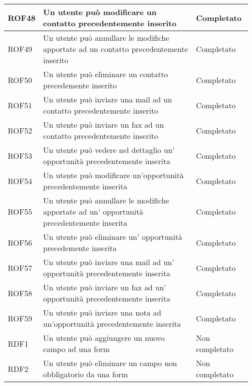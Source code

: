 \begin{longtable}[h]{|p{2.5cm}|p{8cm}|p{2.5cm}|}
	\hline
	\rule[-3mm]{0mm}{0.8cm}
	ROF48&Un utente può modificare un contatto precedentemente inserito&Completato\\
	\hline
	\rule[-3mm]{0mm}{0.8cm}
	ROF49&Un utente può annullare le modifiche apportate ad un contatto precedentemente inserito&Completato\\
	\hline
	\rule[-3mm]{0mm}{0.8cm}
	ROF50&Un utente può eliminare un contatto precedemente inserito&Completato\\
	\hline
	\rule[-3mm]{0mm}{0.8cm}
	ROF51&Un utente può inviare una mail ad un contatto precedentemente inserito&Completato \\
	\hline
	\rule[-3mm]{0mm}{0.8cm}
	ROF52&Un utente può inviare un fax ad un contatto precedentemente inserito&Completato \\
	\hline
	\rule[-3mm]{0mm}{0.8cm}
	ROF53&Un utente può vedere nel dettaglio un' opportunità precedentemente inserita&Completato\\
	\hline
	ROF54&Un utente può modificare un'opportunità precedentemente inserita&Completato\\
	\hline
	\rule[-3mm]{0mm}{0.8cm}
	ROF55&Un utente può annullare le modifiche apportate ad un' opportunità precedentemente inserita&Completato\\
	\hline
	\rule[-3mm]{0mm}{0.8cm}
	ROF56&Un utente può eliminare un' opportunità precedemente inserita&Completato\\
	\hline
	\rule[-3mm]{0mm}{0.8cm}
	ROF57&Un utente può inviare una mail ad un' opportunità precedentemente inserita&Completato \\
	\hline
	\rule[-3mm]{0mm}{0.8cm}
	ROF58&Un utente può inviare un fax ad un' opportunità precedentemente inserita&Completato \\
	\hline
	\rule[-3mm]{0mm}{0.8cm}
	ROF59&Un utente può inviare una nota ad un'opportunità precedentemente inserita& Completato\\
	\hline
	\rule[-3mm]{0mm}{0.8cm}
	RDF1&Un utente può aggiungere un nuovo campo ad una form&Non completato\\
	\hline
	\rule[-3mm]{0mm}{0.8cm}
	RDF2&Un utente può eliminare un campo non obbligatorio da una form& Non completato \\
	\hline
\end{longtable}

